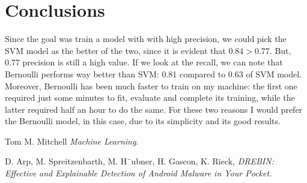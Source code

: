 \documentclass[12pt]{article}
\begin{document}
\section{Conclusions}
Since the goal was train a model with with high precision, we could pick the SVM model as the better of the two, since it is evident that $0.84 > 0.77$. But, 0.77 precision is still a high value. If we look at the recall, we can note that Bernoulli performs way better than SVM: 0.81 compared to 0.63 of SVM model. Moreover, Bernoulli has been much faster to train on my machine: the first one required just some minutes to fit, evaluate and complete its training, while the latter required half an hour to do the same. For these two reasons I would prefer the Bernoulli model, in this case, due to its simplicity and its good results. 

\begin{thebibliography}{10}
	
	Tom M. Mitchell \textsl{Machine Learning}.
	
	D. Arp, M. Spreitzenbarth, M. H¨ubner, H. Gascon, K. Rieck, \textsl{DREBIN: Effective and Explainable Detection of Android Malware in Your Pocket}.
	

		
\end{thebibliography}
\end{document}

